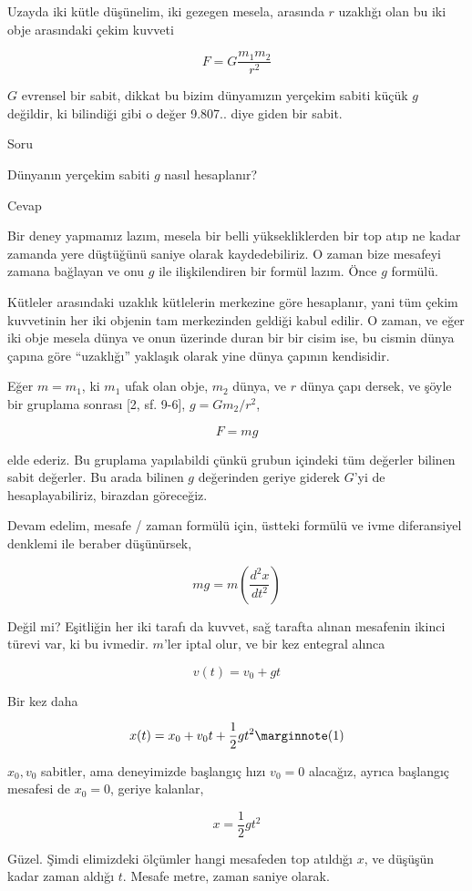 \documentclass[12pt,fleqn]{article}\usepackage{../../common}
\begin{document}
Uzayda iki kütle düşünelim, iki gezegen mesela, arasında $r$ uzaklığı olan
bu iki obje arasındaki çekim kuvveti

$$ F = G \frac{m_1m_2}{r^2}$$

$G$ evrensel bir sabit, dikkat bu bizim dünyamızın yerçekim sabiti küçük
$g$ değildir, ki bilindiği gibi o değer 9.807.. diye giden bir sabit.

Soru

Dünyanın yerçekim sabiti $g$ nasıl hesaplanır? 

Cevap

Bir deney yapmamız lazım, mesela bir belli yüksekliklerden bir top atıp ne
kadar zamanda yere düştüğünü saniye olarak kaydedebiliriz. O zaman bize
mesafeyi zamana bağlayan ve onu $g$ ile ilişkilendiren bir formül
lazım. Önce $g$ formülü.

Kütleler arasındaki uzaklık kütlelerin merkezine göre hesaplanır, yani tüm
çekim kuvvetinin her iki objenin tam merkezinden geldiği kabul edilir. O
zaman, ve eğer iki obje mesela dünya ve onun üzerinde duran bir bir cisim
ise, bu cismin dünya çapına göre ``uzaklığı'' yaklaşık olarak yine dünya
çapının kendisidir.

Eğer $m = m_1$, ki $m_1$ ufak olan obje, $m_2$ dünya, ve $r$ dünya çapı
dersek, ve şöyle bir gruplama sonrası [2, sf. 9-6], $g = Gm_2 / r^2$,

$$ F = m g$$

elde ederiz. Bu gruplama yapılabildi çünkü grubun içindeki tüm değerler bilinen
sabit değerler. Bu arada bilinen $g$ değerinden geriye giderek $G$'yi de
hesaplayabiliriz, birazdan göreceğiz.

Devam edelim, mesafe / zaman formülü için, üstteki formülü ve ivme diferansiyel
denklemi ile beraber düşünürsek,

$$ mg = m(\frac{d^2x}{dt^2})$$

Değil mi? Eşitliğin her iki tarafı da kuvvet, sağ tarafta alınan mesafenin
ikinci türevi var, ki bu ivmedir. $m$'ler iptal olur, ve bir kez entegral
alınca 

$$ v(t) = v_0 + gt$$

Bir kez daha

$$ 
x(t) = x_0 + v_0t + \frac{1}{2}gt^2
\mlabel{1}
$$

$x_0,v_0$ sabitler, ama deneyimizde başlangıç hızı $v_0=0$ alacağız, ayrıca
başlangıç mesafesi de $x_0=0$, geriye kalanlar,

$$ x = \frac{1}{2}gt^2$$

Güzel. Şimdi elimizdeki ölçümler hangi mesafeden top atıldığı $x$, ve
düşüşün kadar zaman aldığı $t$. Mesafe metre, zaman saniye olarak.
\end{document}
